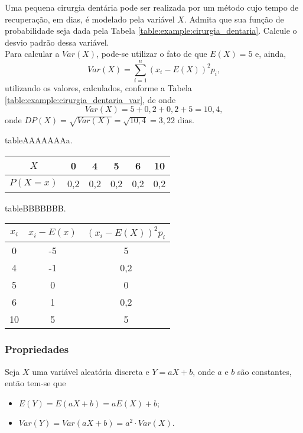 \documentclass[11pt,fleqn]{book}
\numberwithin{mpicture}{chapter}
\numberwithin{mtable}{chapter}
\numberwithin{mframe}{chapter}
\begin{document}
\begin{example}
	Uma pequena cirurgia dentária pode ser realizada por um método cujo tempo de recuperação, em dias, é modelado pela variável $X$. Admita que sua função de probabilidade seja dada pela Tabela \ref{table:example:cirurgia_dentaria}. Calcule o desvio padrão dessa variável.\\

	Para calcular a $Var(X)$, pode-se utilizar o fato de que $E(X)=5$ e, ainda,
	\[
		Var(X)=\sum_{i=1}^{n} (x_i - E(X))^2 p_i\text{,}
	\]
	utilizando os valores, calculados, conforme a Tabela \ref{table:example:cirurgia_dentaria_var}, de onde
	\[
		Var(X)=5+0,2+0,2+5=10,4\text{,}
	\]
	onde $DP(X)=\sqrt{Var(X)}=\sqrt{10,4}=3,22$ dias.
\end{example}

\begin{sidepicture}{7cm}{table}{AAAAAAAa.}
	\label{table:example:cirurgia_dentaria}
	\begin{tabular}{c|ccccc}
		$X$ & 0 & 4 & 5 & 6 & 10 \\ \toprule
		$P(X=x)$ & 0,2 & 0,2 & 0,2 & 0,2 & 0,2 \\
	\end{tabular}
\end{sidepicture}

\begin{sidepicture}{4cm}{table}{BBBBBBB.}
	\label{table:example:cirurgia_dentaria_var}
	\begin{tabular}{c|c|c}
		$x_i$ & $x_i-E(x)$ & $(x_i-E(X))^2p_i$ \\ \toprule
		0 & -5 & 5 \\
		4 & -1 & 0,2 \\
		5 & 0 & 0 \\
		6 & 1 & 0,2 \\
		10 & 5 & 5 \\
	\end{tabular}
\end{sidepicture}

\subsubsection*{Propriedades}

\begin{theorem}
	Seja $X$ uma variável aleatória discreta e $Y=aX+b$, onde $a$ e $b$ são constantes, então tem-se que
	\begin{itemize}
		\item $E(Y)=E(aX+b)=aE(X)+b$;
		\item $Var(Y)=Var(aX+b)=a^2\cdot Var(X)$.
	\end{itemize}
\end{theorem}
\end{document}
